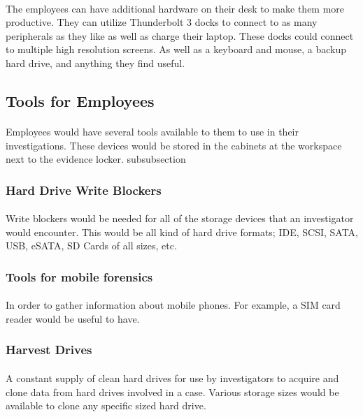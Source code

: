 \documentclass{article}
\begin{document}
\paragraph{}
The employees can have additional hardware on their desk to make them more productive.
They can utilize Thunderbolt 3 docks to connect to as many peripherals as they like as well as charge their laptop.
These docks could connect to multiple high resolution screens. As well as a keyboard and mouse, a backup hard drive, and anything they find useful.

 
\subsection{Tools for Employees} 
\paragraph{}
Employees would have several tools available to them to use in their investigations.
These devices would be stored in the cabinets at the workspace next to the evidence locker.
subsubsection
\subsubsection{Hard Drive Write Blockers}
\paragraph{}
Write blockers would be needed for all of the storage devices that an investigator would encounter.
This would be all kind of hard drive formats; IDE, SCSI, SATA, USB, eSATA, SD Cards of all sizes, etc.
\subsubsection{Tools for mobile forensics}
\paragraph{}
In order to gather information about mobile phones. For example, a SIM card reader would be useful to have.
\subsubsection{Harvest Drives}
\paragraph{}
A constant supply of clean hard drives for use by investigators to acquire and clone data from hard drives involved in a case.
Various storage sizes would be available to clone any specific sized hard drive.
\end{document}
